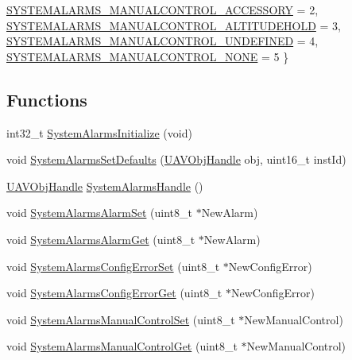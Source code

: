 \begin{DoxyCompactItemize}
\hyperlink{group___system_alarms_gga85e0a17342a1de346ffcee73de9b5f81af24c094a0488fdb3d973eeb8fd45d8e5}{\-S\-Y\-S\-T\-E\-M\-A\-L\-A\-R\-M\-S\-\_\-\-M\-A\-N\-U\-A\-L\-C\-O\-N\-T\-R\-O\-L\-\_\-\-A\-C\-C\-E\-S\-S\-O\-R\-Y} = 2, 
\hyperlink{group___system_alarms_gga85e0a17342a1de346ffcee73de9b5f81a4bf184a66b0e91ac3f02f8e807f0f6b0}{\-S\-Y\-S\-T\-E\-M\-A\-L\-A\-R\-M\-S\-\_\-\-M\-A\-N\-U\-A\-L\-C\-O\-N\-T\-R\-O\-L\-\_\-\-A\-L\-T\-I\-T\-U\-D\-E\-H\-O\-L\-D} = 3, 
\*
\hyperlink{group___system_alarms_gga85e0a17342a1de346ffcee73de9b5f81a345ce82199d6e4d6a33ef0eb4d689fa5}{\-S\-Y\-S\-T\-E\-M\-A\-L\-A\-R\-M\-S\-\_\-\-M\-A\-N\-U\-A\-L\-C\-O\-N\-T\-R\-O\-L\-\_\-\-U\-N\-D\-E\-F\-I\-N\-E\-D} = 4, 
\hyperlink{group___system_alarms_gga85e0a17342a1de346ffcee73de9b5f81af34605fe131c84a723dca9cca685aee2}{\-S\-Y\-S\-T\-E\-M\-A\-L\-A\-R\-M\-S\-\_\-\-M\-A\-N\-U\-A\-L\-C\-O\-N\-T\-R\-O\-L\-\_\-\-N\-O\-N\-E} = 5
 \}
\end{DoxyCompactItemize}
\subsection*{\-Functions}
\begin{DoxyCompactItemize}
\item 
int32\-\_\-t \hyperlink{group___system_alarms_ga2359ee747f7474866a6f915bd1a50228}{\-System\-Alarms\-Initialize} (void)
\item 
void \hyperlink{group___system_alarms_gaff3881b31528f8a029d4490665e71658}{\-System\-Alarms\-Set\-Defaults} (\hyperlink{targets_2_u_a_v_objects_2inc_2uavobjectmanager_8h_a279053e22be53ce9f895043aaeb91e3b}{\-U\-A\-V\-Obj\-Handle} obj, uint16\-\_\-t inst\-Id)
\item 
\hyperlink{targets_2_u_a_v_objects_2inc_2uavobjectmanager_8h_a279053e22be53ce9f895043aaeb91e3b}{\-U\-A\-V\-Obj\-Handle} \hyperlink{group___system_alarms_ga8e014f804d4b64303c4cec99766d3516}{\-System\-Alarms\-Handle} ()
\item 
void \hyperlink{group___system_alarms_ga6a849886968bb16772e5863ae460d081}{\-System\-Alarms\-Alarm\-Set} (uint8\-\_\-t $\ast$\-New\-Alarm)
\item 
void \hyperlink{group___system_alarms_gacf83a8f24d7975077987996077d46406}{\-System\-Alarms\-Alarm\-Get} (uint8\-\_\-t $\ast$\-New\-Alarm)
\item 
void \hyperlink{group___system_alarms_ga0886468e7a398371363087e1de84e967}{\-System\-Alarms\-Config\-Error\-Set} (uint8\-\_\-t $\ast$\-New\-Config\-Error)
\item 
void \hyperlink{group___system_alarms_gac1ab2dbd6a9a46b085e920cb68204b04}{\-System\-Alarms\-Config\-Error\-Get} (uint8\-\_\-t $\ast$\-New\-Config\-Error)
\item 
void \hyperlink{group___system_alarms_gad644d3eeab4ad5bdc52f3fe18ac5007d}{\-System\-Alarms\-Manual\-Control\-Set} (uint8\-\_\-t $\ast$\-New\-Manual\-Control)
\item 
void \hyperlink{group___system_alarms_ga6ccdf69830c387cdb0173ac18563d7f3}{\-System\-Alarms\-Manual\-Control\-Get} (uint8\-\_\-t $\ast$\-New\-Manual\-Control)
\end{DoxyCompactItemize}


